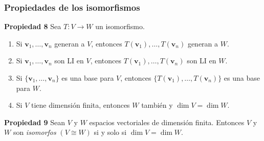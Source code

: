 \begin{frame}\frametitle{Propiedades de los isomorfismos}
	
	\begin{prop}{\textbf{Propiedad 8}}
		\justifying
		Sea $T:V\to W$ un isomorfismo. 
		\begin{enumerate}
			\item[\labelname{$a$}] Si $\mathbf{v}_1, \hdots,\mathbf{v}_n$ generan a $V$, entonces
			$T(\mathbf{v}_1), \hdots,T(\mathbf{v}_n)$ generan a $W$.
			\item[\labelname{$b$}] Si $\mathbf{v}_1, \hdots,\mathbf{v}_n$ son LI en $V$, entonces
			$T(\mathbf{v}_1), \hdots,T(\mathbf{v}_n)$ son LI en $W$.
			\item[\labelname{$c$}]  Si $\{\mathbf{v}_1, \hdots,\mathbf{v}_n\}$ es una base para $V$, entonces
			$\{T(\mathbf{v}_1), \hdots,T(\mathbf{v}_n)\}$ es una base para $W$.
			\item[\labelname{$d$}] Si $V$ tiene dimensión finita, entonces $W$ también y $\dim V=\dim W$.
		\end{enumerate}
	\end{prop}	
	
	\begin{prop}{\textbf{Propiedad 9}}
		\justifying
		Sean $V$ y $W$ espacios vectoriales de dimensión finita. Entonces $V$ y $W$ son \textit{isomorfos} $(V\cong W)$ 
		si y solo si $\dim V = \dim W$.
	\end{prop}	
	
\end{frame}


%
%
%	
%	
